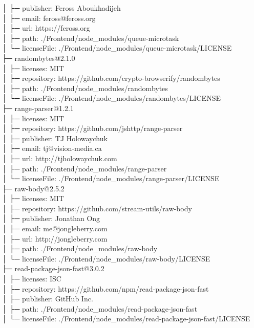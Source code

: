 │  ├─ publisher: Feross Aboukhadijeh\\
│  ├─ email: feross@feross.org\\
│  ├─ url: https://feross.org\\
│  ├─ path: ./Frontend/node\_modules/queue-microtask\\
│  └─ licenseFile: ./Frontend/node\_modules/queue-microtask/LICENSE\\
├─ randombytes@2.1.0\\
│  ├─ licenses: MIT\\
│  ├─ repository: https://github.com/crypto-browserify/randombytes\\
│  ├─ path: ./Frontend/node\_modules/randombytes\\
│  └─ licenseFile: ./Frontend/node\_modules/randombytes/LICENSE\\
├─ range-parser@1.2.1\\
│  ├─ licenses: MIT\\
│  ├─ repository: https://github.com/jshttp/range-parser\\
│  ├─ publisher: TJ Holowaychuk\\
│  ├─ email: tj@vision-media.ca\\
│  ├─ url: http://tjholowaychuk.com\\
│  ├─ path: ./Frontend/node\_modules/range-parser\\
│  └─ licenseFile: ./Frontend/node\_modules/range-parser/LICENSE\\
├─ raw-body@2.5.2\\
│  ├─ licenses: MIT\\
│  ├─ repository: https://github.com/stream-utils/raw-body\\
│  ├─ publisher: Jonathan Ong\\
│  ├─ email: me@jongleberry.com\\
│  ├─ url: http://jongleberry.com\\
│  ├─ path: ./Frontend/node\_modules/raw-body\\
│  └─ licenseFile: ./Frontend/node\_modules/raw-body/LICENSE\\
├─ read-package-json-fast@3.0.2\\
│  ├─ licenses: ISC\\
│  ├─ repository: https://github.com/npm/read-package-json-fast\\
│  ├─ publisher: GitHub Inc.\\
│  ├─ path: ./Frontend/node\_modules/read-package-json-fast\\
│  └─ licenseFile: ./Frontend/node\_modules/read-package-json-fast/LICENSE\\
